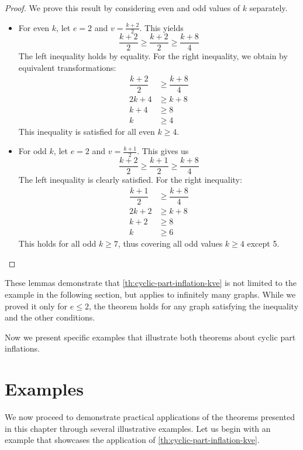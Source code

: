 \documentclass[12pt, twoside]{book}
\begin{document}
\begin{proof}
	We prove this result by considering even and odd values of $k$ separately.
	\begin{itemize}
		\item For even $k$, let $e=2$ and $v=\frac{k+2}{2}$. This yields
		$$\dfrac{k+2}{2}\geq \dfrac{k+2}{2}\geq \dfrac{k+8}{4}$$
		The left inequality holds by equality. For the right inequality, we obtain by equivalent transformations:
		\begin{align*}
			\dfrac{k+2}{2}&\geq \dfrac{k+8}{4} \\
			2k+4&\geq k+8 \\
			k+4&\geq 8 \\
			k&\geq 4
		\end{align*}
		This inequality is satisfied for all even $k\geq 4$.
		
		\item For odd $k$, let $e=2$ and $v=\frac{k+1}{2}$. This gives us
		$$\dfrac{k+2}{2}\geq \dfrac{k+1}{2}\geq \dfrac{k+8}{4}$$
		The left inequality is clearly satisfied. For the right inequality:
		\begin{align*}
			\dfrac{k+1}{2}&\geq \dfrac{k+8}{4} \\
			2k+2&\geq k+8 \\
			k+2&\geq 8 \\
			k&\geq 6
		\end{align*}
		This holds for all odd $k\geq 7$, thus covering all odd values $k\geq 4$ except 5.
	\end{itemize}
\end{proof}

These lemmas demonstrate that \cref{th:cyclic-part-inflation-kve} is not limited to the example in the following section, but applies to infinitely many graphs. While we proved it only for $e\leq 2$, the theorem holds for any graph satisfying the inequality and the other conditions.

Now we present specific examples that illustrate both theorems about cyclic part inflations.

\section{Examples}

We now proceed to demonstrate practical applications of the theorems presented in this chapter through several illustrative examples. Let us begin with an example that showcases the application of \cref{th:cyclic-part-inflation-kve}.
\end{document}
